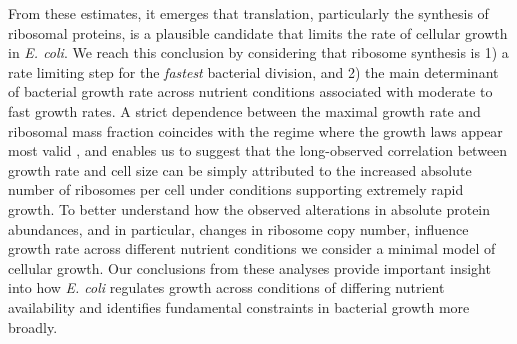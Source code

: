 From these estimates, it emerges that translation, particularly the synthesis of
ribosomal proteins, is a plausible candidate that limits the rate of cellular
growth in \textit{E. coli}. We reach this conclusion by considering that
ribosome synthesis is 1) a rate limiting step for the \textit{fastest} bacterial
division, and  2) the main determinant of bacterial growth rate across  nutrient
conditions associated with moderate to fast growth rates. A strict dependence
between the maximal growth rate and ribosomal mass fraction coincides with the
regime where the growth laws appear most valid \citep{amir2017, scott2010}, and
enables us to  suggest that the long-observed correlation between growth rate
and cell size \citep{schaechter1958, si2017} can be simply attributed to the
increased absolute number of ribosomes per cell under conditions supporting
extremely rapid growth. To better understand how the observed alterations in
absolute protein abundances, and in particular, changes in ribosome copy number,
influence growth rate across different nutrient conditions we consider a minimal
model of cellular growth. Our conclusions from these analyses provide important
insight into how \textit{E. coli} regulates growth across conditions of
differing nutrient availability and identifies fundamental constraints in
bacterial growth more broadly.






\begin{figure}
\end{figure}
